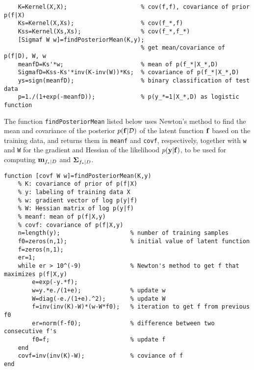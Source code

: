 \documentclass{article}
\begin{document}
\begin{verbatim}
    K=Kernel(X,X);                     % cov(f,f), covariance of prior p(f|X)
    Ks=Kernel(X,Xs);                   % cov(f_*,f)
    Kss=Kernel(Xs,Xs);                 % cov(f_*,f_*)
    [Sigmaf W w]=findPosteriorMean(K,y);   
                                       % get mean/covariance of p(f|D), W, w
    meanfD=Ks'*w;                      % mean of p(f_*|X_*,D)
    SigmafD=Kss-Ks'*inv(K-inv(W))*Ks;  % covariance of p(f_*|X_*,D)
    ys=sign(meanfD);                   % binary classification of test data
    p=1./(1+exp(-meanfD));             % p(y_*=1|X_*,D) as logistic function
\end{verbatim}

The function \verb|findPosteriorMean| listed below uses Newton's method
to find the mean and covariance of the posterior $p({\bf f}|{\cal D})$
of the latent function ${\bf f}$ based on the training data, and returns 
them in \verb|meanf| and \verb|covf|, respectively, together with \verb|w| 
and \verb|W| for the gradient and Hessian of the likelihood 
$p({\bf y}|{\bf f})$, to be used for computing ${\bf m}_{f_*|D}$ 
and ${\bf\Sigma}_{f_*|D}$.

\begin{verbatim}
function [covf W w]=findPosteriorMean(K,y)  
    % K: covariance of prior of p(f|X)
    % y: labeling of training data X
    % w: gradient vector of log p(y|f)
    % W: Hessian matrix of log p(y|f)
    % meanf: mean of p(f|X,y)
    % covf: covariance of p(f|X,y)
    n=length(y);                    % number of training samples
    f0=zeros(n,1);                  % initial value of latent function
    f=zeros(n,1);        
    er=1;
    while er > 10^(-9)              % Newton's method to get f that maximizes p(f|X,y)
        e=exp(-y.*f);
        w=y.*e./(1+e);              % update w
        W=diag(-e./(1+e).^2);       % update W
        f=inv(inv(K)-W)*(w-W*f0);   % iteration to get f from previous f0
        er=norm(f-f0);              % difference between two consecutive f's
        f0=f;                       % update f
    end
    covf=inv(inv(K)-W);             % coviance of f
end
\end{verbatim}
\end{document}
